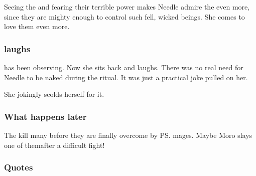 \begin{garbage}
Seeing the \banes{} and fearing their terrible power makes Needle admire the \resphain{} even more, since they are mighty enough to control such fell, wicked beings. 
She comes to love them even more. 





\subsubsection{\Achsah{} laughs}
\Achsah{} has been observing. 
Now she sits back and laughs. 
There was no real need for Needle to be naked during the ritual. 
It was just a practical joke \Achsah{} pulled on her. 

She jokingly scolds herself for it. 





\subsubsection{What happens later}
The \banes{} kill many before they are finally overcome by \ps{\Psyrex}{} mages. 
Maybe Moro \Cornel{} slays one of them\dash after a difficult fight!





\subsubsection{Quotes}
\end{garbage}
